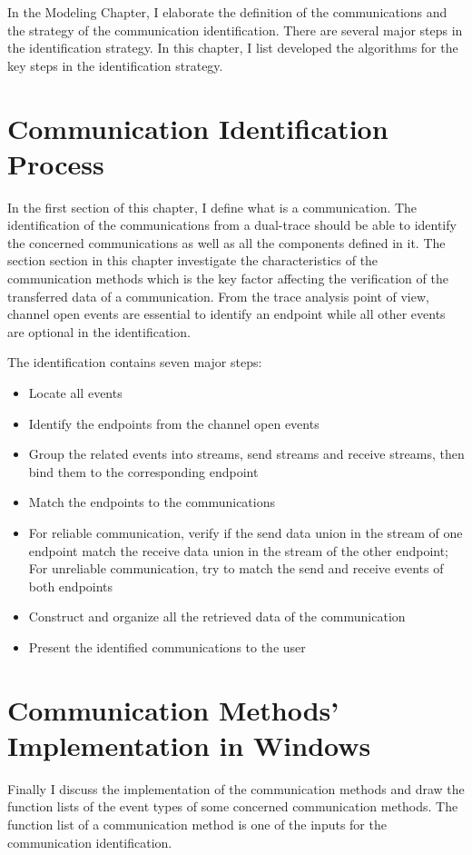 
\label{chapter:appendix}
\label{chapter:alo}
In the Modeling Chapter, I elaborate the definition of the communications and the strategy of the communication identification. There are several major steps in the identification strategy. In this chapter, I list developed the algorithms for the key steps in the identification strategy.  

\section{Communication Identification Process}
In the first section of this chapter, I define what is a communication. The identification of the communications from a dual-trace should be able to identify the concerned communications as well as all the components defined in it. The section section in this chapter investigate the characteristics of the communication methods which is the key factor affecting the verification of the transferred data of a communication. From the trace analysis point of view, channel open events are essential to identify an endpoint while all other events are optional in the identification.

The identification contains seven major steps:
\begin{itemize}
 \item Locate all events
 \item Identify the endpoints from the channel open events
 \item Group the related events into streams, send streams and receive streams, then bind them to the corresponding endpoint
 \item Match the endpoints to the communications
 \item For reliable communication, verify if the send data union in the stream of one endpoint match the receive data union in the stream of the other endpoint; For unreliable communication, try to match the send and receive events of both endpoints 
 \item Construct and organize all the retrieved data of the communication 
 \item Present the identified communications to the user
\end{itemize}

\section{Communication Methods' Implementation in Windows}\label{windows}
Finally I discuss the implementation of the communication methods and draw the function lists of the event types of some concerned communication methods. The function list of a communication method is one of the inputs for the communication identification.

